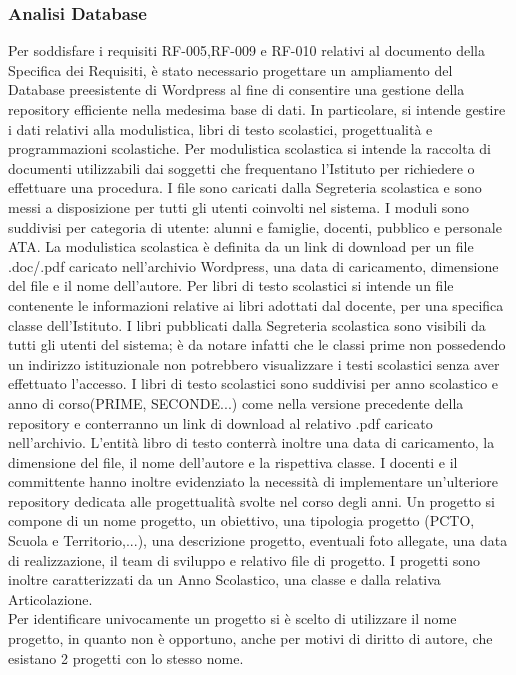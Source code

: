 \documentclass{article}
\begin{document}
	\subsubsection{\textbf{Analisi Database}}
	Per soddisfare i requisiti RF-005,RF-009 e RF-010 relativi al documento della Specifica dei Requisiti, è stato necessario progettare un ampliamento del Database preesistente di Wordpress al fine di consentire una gestione della repository efficiente nella medesima base di dati.
	In particolare, si intende gestire i dati relativi alla modulistica, libri di testo scolastici, progettualità e programmazioni scolastiche.
	Per modulistica scolastica si intende la raccolta di documenti utilizzabili dai soggetti che frequentano l'Istituto per richiedere o effettuare una procedura. I file sono caricati dalla Segreteria scolastica e sono messi a disposizione per tutti gli utenti coinvolti nel sistema. I moduli sono suddivisi per categoria di utente: alunni e famiglie, docenti, pubblico e personale ATA.
	La modulistica scolastica è definita da un link di download per un file .doc/.pdf caricato nell'archivio Wordpress, una data di caricamento, dimensione del file e il nome dell'autore.
	Per libri di testo scolastici si intende un file contenente le informazioni relative ai libri adottati dal docente, per una specifica classe dell'Istituto. I libri pubblicati dalla Segreteria scolastica sono visibili da tutti gli utenti del sistema; è da notare infatti che le classi prime non possedendo un indirizzo istituzionale non potrebbero visualizzare i testi scolastici senza aver effettuato l'accesso.
	I libri di testo scolastici sono suddivisi per anno scolastico e anno di corso(PRIME, SECONDE...) come nella versione precedente della repository e conterranno un link di download al relativo .pdf caricato nell'archivio. L'entità libro di testo conterrà inoltre una data di caricamento, la dimensione del file, il nome dell'autore e la rispettiva classe.
	I docenti e il committente hanno inoltre evidenziato la necessità di implementare un'ulteriore repository dedicata alle progettualità svolte nel corso degli anni.
	Un progetto si compone di un nome progetto, un obiettivo, una tipologia progetto (PCTO, Scuola e Territorio,...), una descrizione progetto, eventuali foto allegate, una data di realizzazione, il team di sviluppo e relativo file di progetto. I progetti sono inoltre caratterizzati da un Anno Scolastico, una classe e dalla relativa Articolazione.\\ 
	Per identificare univocamente un progetto si è scelto di utilizzare il nome progetto, in quanto non è opportuno, anche per motivi di diritto di autore, che esistano 2 progetti con lo stesso nome.
\end{document}
